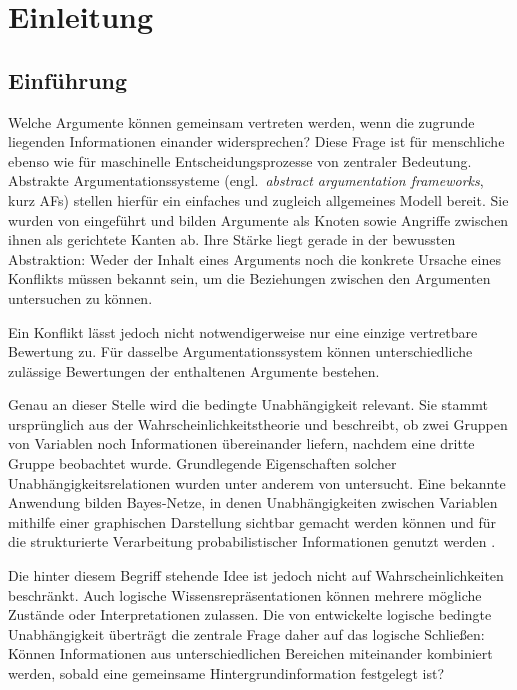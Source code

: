 \chapter{Einleitung}
\label{chap:einleitung}

\section{Einführung}
\label{sec:einleitung-einfuehrung}

Welche Argumente können gemeinsam vertreten werden, wenn die zugrunde liegenden Informationen einander widersprechen? 
Diese Frage ist für menschliche ebenso wie für maschinelle Entscheidungsprozesse von zentraler Bedeutung. 
Abstrakte Argumentationssysteme (engl.\ \emph{abstract argumentation frameworks}, kurz AFs) stellen hierfür ein einfaches und zugleich allgemeines Modell bereit. 
Sie wurden von \textcite{dung:1995:af} eingeführt und bilden Argumente als Knoten sowie Angriffe zwischen ihnen als gerichtete Kanten ab. 
Ihre Stärke liegt gerade in der bewussten Abstraktion: Weder der Inhalt eines Arguments noch die konkrete Ursache eines Konflikts müssen bekannt sein, 
um die Beziehungen zwischen den Argumenten untersuchen zu können.

Ein Konflikt lässt jedoch nicht notwendigerweise nur eine einzige vertretbare Bewertung zu. 
Für dasselbe Argumentationssystem können unterschiedliche zulässige Bewertungen der enthaltenen Argumente bestehen. 

Genau an dieser Stelle wird die bedingte Unabhängigkeit relevant. Sie stammt ursprünglich aus der Wahrscheinlichkeitstheorie und beschreibt, 
ob zwei Gruppen von Variablen noch Informationen übereinander liefern, nachdem eine dritte Gruppe beobachtet wurde. 
Grundlegende Eigenschaften solcher Unabhängigkeitsrelationen wurden unter anderem von \textcite{pearl:paz:1986:graphoids} untersucht. 
Eine bekannte Anwendung bilden Bayes-Netze, in denen Unabhängigkeiten zwischen Variablen mithilfe einer graphischen Darstellung 
sichtbar gemacht werden können und für die strukturierte Verarbeitung probabilistischer Informationen genutzt werden \cite{pearl:2010}.

Die hinter diesem Begriff stehende Idee ist jedoch nicht auf Wahrscheinlichkeiten beschränkt. Auch logische Wissensrepräsentationen 
können mehrere mögliche Zustände oder Interpretationen zulassen. Die von \textcite{darwiche:1997:logical-ci} entwickelte logische 
bedingte Unabhängigkeit überträgt die zentrale Frage daher auf das logische Schließen: Können Informationen aus unterschiedlichen 
Bereichen miteinander kombiniert werden, sobald eine gemeinsame Hintergrundinformation festgelegt ist?

